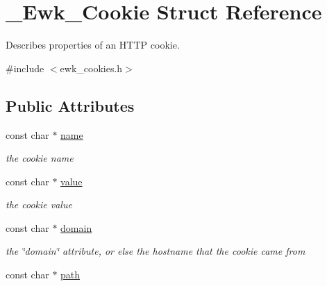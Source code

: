 \hypertarget{struct__Ewk__Cookie}{\section{\+\_\+\+Ewk\+\_\+\+Cookie Struct Reference}
\label{struct__Ewk__Cookie}
}


Describes properties of an H\+T\+T\+P cookie.  




{\ttfamily \#include $<$ewk\+\_\+cookies.\+h$>$}

\subsection*{Public Attributes}
\begin{DoxyCompactItemize}
\item 
\hypertarget{struct__Ewk__Cookie_a46b5b5893da21d5344767ae6a935feb4}{const char $\ast$ \hyperlink{struct__Ewk__Cookie_a46b5b5893da21d5344767ae6a935feb4}{name}}\label{struct__Ewk__Cookie_a46b5b5893da21d5344767ae6a935feb4}

\begin{DoxyCompactList}\small\item\em the cookie name \end{DoxyCompactList}\item 
\hypertarget{struct__Ewk__Cookie_ab958319f695de53f8e77a28e38a05612}{const char $\ast$ \hyperlink{struct__Ewk__Cookie_ab958319f695de53f8e77a28e38a05612}{value}}\label{struct__Ewk__Cookie_ab958319f695de53f8e77a28e38a05612}

\begin{DoxyCompactList}\small\item\em the cookie value \end{DoxyCompactList}\item 
\hypertarget{struct__Ewk__Cookie_a5fffdb74a212d6d00c3f3a71e2514dac}{const char $\ast$ \hyperlink{struct__Ewk__Cookie_a5fffdb74a212d6d00c3f3a71e2514dac}{domain}}\label{struct__Ewk__Cookie_a5fffdb74a212d6d00c3f3a71e2514dac}

\begin{DoxyCompactList}\small\item\em the \char`\"{}domain\char`\"{} attribute, or else the hostname that the cookie came from \end{DoxyCompactList}\item 
\hypertarget{struct__Ewk__Cookie_a428f0f479647c40204cfde7c1ab595a9}{const char $\ast$ \hyperlink{struct__Ewk__Cookie_a428f0f479647c40204cfde7c1ab595a9}{path}}\label{struct__Ewk__Cookie_a428f0f479647c40204cfde7c1ab595a9}


\end{DoxyCompactItemize}
